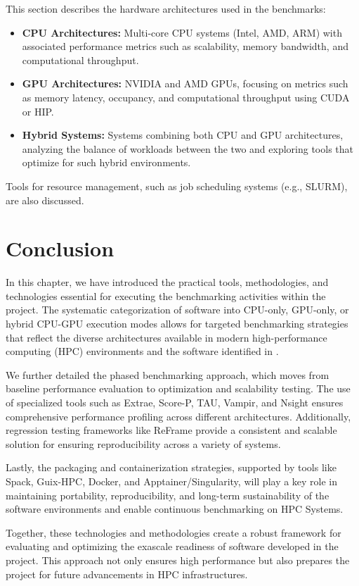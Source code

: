 This section describes the hardware architectures used in the benchmarks:
\begin{itemize}
    \item \textbf{CPU Architectures:} Multi-core CPU systems (Intel, AMD, ARM) with associated performance metrics such as scalability, memory bandwidth, and computational throughput.
    \item \textbf{GPU Architectures:} NVIDIA and AMD GPUs, focusing on metrics such as memory latency, occupancy, and computational throughput using CUDA or HIP.
    \item \textbf{Hybrid Systems:} Systems combining both CPU and GPU architectures, analyzing the balance of workloads between the two and exploring tools that optimize for such hybrid environments.
\end{itemize}
Tools for resource management, such as job scheduling systems (e.g., SLURM), are also discussed.

\section{Conclusion}
\label{sec:Technology-conclusion}

In this chapter, we have introduced the practical tools, methodologies, and technologies essential for executing the benchmarking activities within the \exama project. 
The systematic categorization of software into CPU-only, GPU-only, or hybrid CPU-GPU execution modes allows for targeted benchmarking strategies that reflect the diverse architectures available in modern high-performance computing (HPC) environments and the software identified in \exama.

We further detailed the phased benchmarking approach, which moves from baseline performance evaluation to optimization and scalability testing. The use of specialized tools such as Extrae, Score-P, TAU, Vampir, and Nsight ensures comprehensive performance profiling across different architectures. Additionally, regression testing frameworks like ReFrame provide a consistent and scalable solution for ensuring reproducibility across a variety of systems.

Lastly, the packaging and containerization strategies, supported by tools like Spack, Guix-HPC, Docker, and Apptainer/Singularity, will play a key role in maintaining portability, reproducibility, and long-term sustainability of the software environments and enable continuous benchmarking on HPC Systems.

Together, these technologies and methodologies create a robust framework for evaluating and optimizing the exascale readiness of software developed in the \exama project. This approach not only ensures high performance but also prepares the project for future advancements in HPC infrastructures.